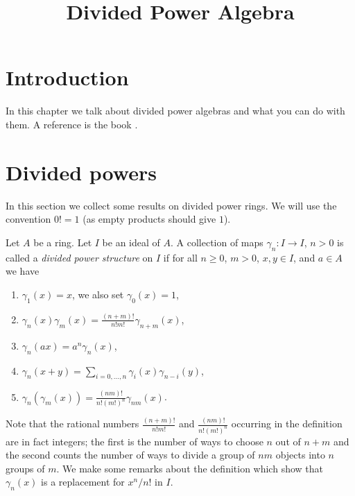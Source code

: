 

%


\title{Divided Power Algebra}


\maketitle

\label{section-phantom}

\tableofcontents

\section{Introduction}
\label{section-introduction}

\noindent
In this chapter we talk about divided power algebras and what
you can do with them. A reference is the book \cite{Berthelot}.





\section{Divided powers}
\label{section-divided-powers}

\noindent
In this section we collect some results on divided power rings.
We will use the convention $0! = 1$ (as empty products should give $1$).

\begin{definition}
\label{definition-divided-powers}
Let $A$ be a ring. Let $I$ be an ideal of $A$. A collection of maps
$\gamma_n : I \to I$, $n > 0$ is called a {\it divided power structure}
on $I$ if for all $n \geq 0$, $m > 0$, $x, y \in I$, and $a \in A$ we have
\begin{enumerate}
\item $\gamma_1(x) = x$, we also set $\gamma_0(x) = 1$,
\item $\gamma_n(x)\gamma_m(x) = \frac{(n + m)!}{n! m!} \gamma_{n + m}(x)$,
\item $\gamma_n(ax) = a^n \gamma_n(x)$,
\item $\gamma_n(x + y) = \sum_{i = 0, \ldots, n} \gamma_i(x)\gamma_{n - i}(y)$,
\item $\gamma_n(\gamma_m(x)) = \frac{(nm)!}{n! (m!)^n} \gamma_{nm}(x)$.
\end{enumerate}
\end{definition}

\noindent
Note that the rational numbers $\frac{(n + m)!}{n! m!}$
and $\frac{(nm)!}{n! (m!)^n}$ occurring in the definition are in fact integers;
the first is the number of ways to choose $n$ out of $n + m$ and
the second counts the number of ways to divide a group of $nm$
objects into $n$ groups of $m$.
We make some remarks about the definition which show that
$\gamma_n(x)$ is a replacement for $x^n/n!$ in $I$.

